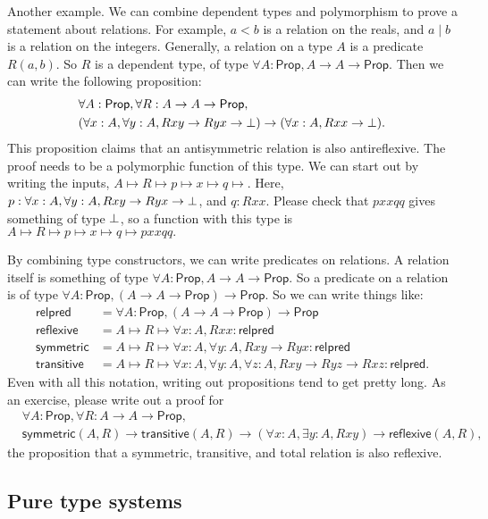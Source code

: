 \documentclass[11pt,paper=letter]{scrartcl}
\newcommand{\sf}{\mathsf}
\newcommand{\prop}{\mathsf{Prop}}
\begin{document}
Another example. We can combine dependent types and polymorphism to prove a statement about relations. For example, $a < b$ is a relation on the reals, and $a \mid b$ is a relation on the integers. Generally, a relation on a type $A$ is a predicate $R(a, b)$. So $R$ is a dependent type, of type $\forall A: \prop, A \to A \to \prop$. Then we can write the following proposition:
\begin{align*}
&\forall A: \prop, \forall R: A \to A \to \prop,\\
&(\forall x: A, \forall y: A, Rxy \to Ryx \to \false) \to (\forall x: A, Rxx \to \false).
\end{align*}
This proposition claims that an antisymmetric relation is also antireflexive. The proof needs to be a polymorphic function of this type. We can start out by writing the inputs, $A \mapsto R \mapsto p \mapsto x \mapsto q \mapsto$. Here, $p : \forall x: A, \forall y: A, Rxy \to Ryx \to \bot$, and $q: Rxx$. Please check that $pxxqq$ gives something of type $\bot$, so a function with this type is $A \mapsto R \mapsto p \mapsto x \mapsto q \mapsto pxxqq.$

By combining type constructors, we can write predicates on relations. A relation itself is something of type $\forall A: \prop, A \to A \to \prop$. So a predicate on a relation is of type $\forall A: \prop, (A \to A \to \prop) \to \prop$. So we can write things like:
\begin{align*}
\sf{relpred} &= \forall A: \prop, (A \to A \to \prop) \to \prop \\
\sf{reflexive} &= A \mapsto R \mapsto \forall x: A, Rxx: \sf{relpred} \\
\sf{symmetric} &= A \mapsto R \mapsto \forall x: A, \forall y: A, Rxy \to Ryx: \sf{relpred} \\
\sf{transitive} &= A \mapsto R \mapsto \forall x: A, \forall y: A, \forall z: A, Rxy \to Ryz \to Rxz: \sf{relpred}.
\end{align*}
Even with all this notation, writing out propositions tend to get pretty long. As an exercise, please write out a proof for
\begin{align*}
&\forall A: \prop, \forall R: A \to A \to \prop,\\
&\sf{symmetric}(A, R) \to \sf{transitive}(A, R) \to (\forall x: A, \exists y: A, Rxy) \to \sf{reflexive}(A, R),
\end{align*}
the proposition that a symmetric, transitive, and total relation is also reflexive.

\subsection{Pure type systems}
\end{document}
